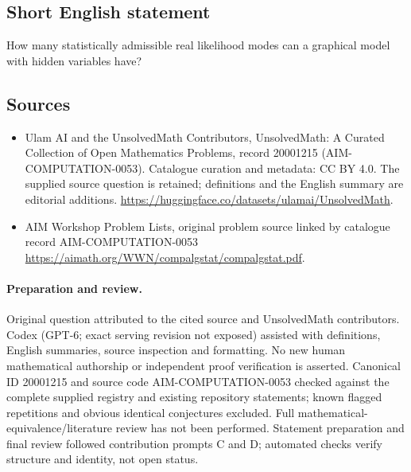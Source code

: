 \documentclass[11pt]{article}
\begin{document}
\subsection{Short English statement}
How many statistically admissible real likelihood modes can a graphical model with hidden variables have?
\subsection{Sources}
\begin{itemize}
\item[\hypertarget{source:20001215:1}{S1}] Ulam AI and the UnsolvedMath Contributors, UnsolvedMath: A Curated Collection of Open Mathematics Problems, record 20001215 (AIM-COMPUTATION-0053). Catalogue curation and metadata: CC BY 4.0. The supplied source question is retained; definitions and the English summary are editorial additions.
\url{https://huggingface.co/datasets/ulamai/UnsolvedMath}.
\item[\hypertarget{source:20001215:2}{S2}] AIM Workshop Problem Lists, original problem source linked by catalogue record AIM-COMPUTATION-0053
\url{https://aimath.org/WWN/compalgstat/compalgstat.pdf}.
\end{itemize}
\paragraph{Preparation and review.}
Original question attributed to the cited source and UnsolvedMath contributors. Codex (GPT-6; exact serving revision not exposed) assisted with definitions, English summaries, source inspection and formatting. No new human mathematical authorship or independent proof verification is asserted. Canonical ID 20001215 and source code AIM-COMPUTATION-0053 checked against the complete supplied registry and existing repository statements; known flagged repetitions and obvious identical conjectures excluded. Full mathematical-equivalence/literature review has not been performed. Statement preparation and final review followed contribution prompts C and D; automated checks verify structure and identity, not open status.
\label{end:20001215}
\end{document}
